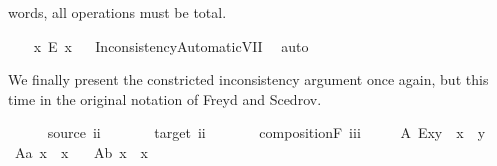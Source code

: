\begin{isabellebody}
\begin{isamarkuptext}
      words, all operations must be total.%
\end{isamarkuptext}\isamarkuptrue%
\ \ \isamarkupfalse%
\ {\isachardoublequoteopen}{\isasymforall}x{\isachardot}\ E\ x{\isachardoublequoteclose}%
\isadelimproof
\ %
\endisadelimproof
%
\isatagproof
{}\isamarkupfalse%
\ InconsistencyAutomaticVII\ \isamarkupfalse%
\ auto%
\endisatagproof
{\isafoldproof}%
%
\isadelimproof
%
\endisadelimproof
%
\begin{isamarkuptext}%
We finally present the constricted inconsistency argument once again, but this time in the original
  notation of Freyd and Scedrov.%
\end{isamarkuptext}\isamarkuptrue%
\isamarkupfalse%
\ \ \isanewline
\ \ \ source{\isacharcolon}{\isacharcolon}\ {\isachardoublequoteopen}i{\isasymRightarrow}i{\isachardoublequoteclose}\ {\isacharparenleft}{\isachardoublequoteopen}{\isasymbox}{\isacharunderscore}{\isachardoublequoteclose}\ {\isacharbrackleft}{}{}{}{\isacharbrackright}\ {}{}{}{\isacharparenright}\ \isanewline
\ \ \ target{\isacharcolon}{\isacharcolon}\ {\isachardoublequoteopen}i{\isasymRightarrow}i{\isachardoublequoteclose}\ {\isacharparenleft}{\isachardoublequoteopen}{\isacharunderscore}{\isasymbox}{\isachardoublequoteclose}\ {\isacharbrackleft}{}{}{}{\isacharbrackright}\ {}{}{}{\isacharparenright}\ \isanewline
\ \ \ compositionF{\isacharcolon}{\isacharcolon}\ {\isachardoublequoteopen}i{\isasymRightarrow}i{\isasymRightarrow}i{\isachardoublequoteclose}\ {\isacharparenleft}\ {\isachardoublequoteopen}\isactrlbold {\isasymcdot}{\isachardoublequoteclose}\ {}{}{}{\isacharparenright}\isanewline
\isanewline
\isanewline
\ \ A{}{\isacharcolon}\ {\isachardoublequoteopen}E{\isacharparenleft}x\isactrlbold {\isasymcdot}y{\isacharparenright}\ \isactrlbold {\isasymleftrightarrow}\ {\isacharparenleft}x{\isasymbox}\ {\isasymcong}\ {\isasymbox}y{\isacharparenright}{\isachardoublequoteclose}\ \ \isanewline
\ A{}a{\isacharcolon}\ {\isachardoublequoteopen}{\isacharparenleft}{\isacharparenleft}{\isasymbox}x{\isacharparenright}{\isasymbox}{\isacharparenright}\ {\isasymcong}\ {\isasymbox}x{\isachardoublequoteclose}\ \ \isanewline
\ A{}b{\isacharcolon}\ {\isachardoublequoteopen}{\isasymbox}{\isacharparenleft}x{\isasymbox}{\isacharparenright}\ {\isasymcong}\ {\isasymbox}x{\isachardoublequoteclose}\ \ \isanewline

\end{isabellebody}
